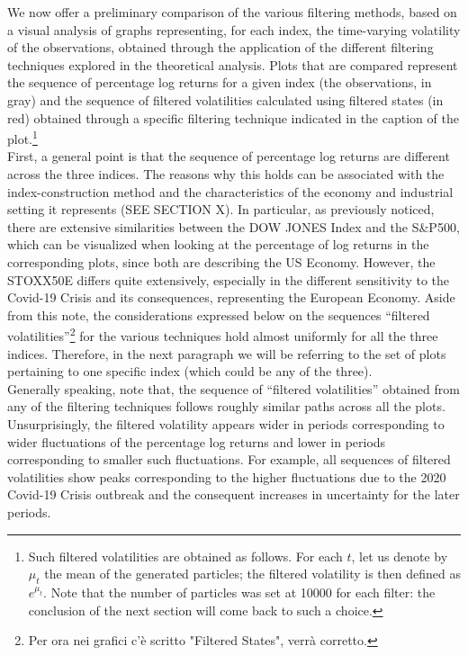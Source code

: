 \documentclass[
]{book}
\theoremstyle{break}
\theoremstyle{nonumberplain}
\begin{document}
We now offer a preliminary comparison of the various filtering methods,
based on a visual analysis of graphs representing, for each index, the
time-varying volatility of the observations, obtained through the
application of the different filtering techniques explored in the
theoretical analysis. Plots that are compared represent the sequence of
percentage log returns for a given index (the observations, in gray) and
the sequence of filtered volatilities calculated using filtered states
(in red) obtained through a specific filtering technique indicated in
the caption of the
plot.\footnote{Such filtered volatilities are obtained as follows. For each $t$, let us denote by $\mu_t$ the mean of the generated particles; the filtered volatility is then defined as $e^{\mu_t}$. Note that the number of particles was set at 10000 for each filter: the conclusion of the next section will come back to such a choice.}\\

First, a general point is that the sequence of percentage log returns
are different across the three indices. The reasons why this holds can
be associated with the index-construction method and the characteristics
of the economy and industrial setting it represents (SEE SECTION X). In
particular, as previously noticed, there are extensive similarities
between the DOW JONES Index and the S\&P500, which can be visualized
when looking at the percentage of log returns in the corresponding
plots, since both are describing the US Economy. However, the STOXX50E
differs quite extensively, especially in the different sensitivity to
the Covid-19 Crisis and its consequences, representing the European
Economy. Aside from this note, the considerations expressed below on the
sequences ``filtered
volatilities''\footnote{Per ora nei grafici c'è scritto "Filtered States", verrà corretto.}
for the various techniques hold almost uniformly for all the three
indices. Therefore, in the next paragraph we will be referring to the
set of plots pertaining to one specific index (which could be any of the
three).\\

Generally speaking, note that, the sequence of ``filtered volatilities''
obtained from any of the filtering techniques follows roughly similar
paths across all the plots. Unsurprisingly, the filtered volatility
appears wider in periods corresponding to wider fluctuations of the
percentage log returns and lower in periods corresponding to smaller
such fluctuations. For example, all sequences of filtered volatilities
show peaks corresponding to the higher fluctuations due to the 2020
Covid-19 Crisis outbreak and the consequent increases in uncertainty for
the later periods.\\
\end{document}
